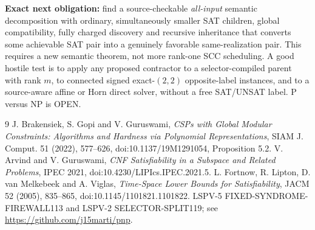 \documentclass[11pt]{article}
\begin{document}
\textbf{Exact next obligation:} find a source-checkable \emph{all-input} semantic decomposition with ordinary, simultaneously smaller SAT children, global compatibility, fully charged discovery and recursive inheritance that converts some achievable SAT pair into a genuinely favorable same-realization pair. This requires a new semantic theorem, not more rank-one SCC scheduling. A good hostile test is to apply any proposed contractor to a selector-compiled parent with rank $m$, to connected signed exact-$(2,2)$ opposite-label instances, and to a source-aware affine or Horn direct solver, without a free SAT/UNSAT label. P versus NP is OPEN.

\begin{thebibliography}{9}
 J. Brakensiek, S. Gopi and V. Guruswami, \emph{CSPs with Global Modular Constraints: Algorithms and Hardness via Polynomial Representations}, SIAM J. Comput. 51 (2022), 577--626, doi:10.1137/19M1291054, Proposition 5.2.
 V. Arvind and V. Guruswami, \emph{CNF Satisfiability in a Subspace and Related Problems}, IPEC 2021, doi:10.4230/LIPIcs.IPEC.2021.5.
 L. Fortnow, R. Lipton, D. van Melkebeek and A. Viglas, \emph{Time-Space Lower Bounds for Satisfiability}, JACM 52 (2005), 835--865, doi:10.1145/1101821.1101822.
 LSPV-5 FIXED-SYNDROME-FIREWALL113 and LSPV-2 SELECTOR-SPLIT119; see \url{https://github.com/j15marti/pnp}.
\end{thebibliography}
\end{document}

